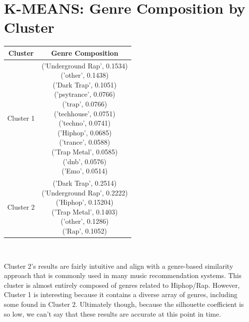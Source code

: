 \documentclass[conference]{IEEEtran}
\begin{document}
\section*{K-MEANS: Genre Composition by Cluster}
\begin{table}[ht!]
    \centering
        \begin{tabular}{| c | c |}
        \hline
        Cluster & Genre Composition \\
        \hline
        Cluster 1 & \makecell{ ('Underground Rap', 0.1534) \\ ('other', 0.1438) \\ ('Dark Trap', 0.1051) \\ ('psytrance', 0.0766) \\ ('trap', 0.0766) \\ ('techhouse', 0.0751) \\ ('techno', 0.0741) \\ ('Hiphop', 0.0685) \\ ('trance', 0.0588) \\ ('Trap Metal', 0.0585) \\ ('dnb', 0.0576) \\ ('Emo', 0.0514) \\ } \\ 
        \hline
        Cluster 2 & \makecell{('Dark Trap', 0.2514) \\ ('Underground Rap', 0.2222) \\ ('Hiphop', 0.15204) \\ ('Trap Metal', 0.1403) \\ ('other', 0.1286) \\ ('Rap', 0.1052) \\ } \\ 
        \hline
        \end{tabular} \\
        \label{tab:kmeans-clust-prof}
\end{table}


Cluster 2's results are fairly intuitive and align with a genre-based similarity approach that is commonly used in many music recommendation systems. This cluster is almost entirely composed of genres related to Hiphop/Rap. However, Cluster 1 is interesting because it contains a diverse array of genres, including some found in Cluster 2. Ultimately though, because the silhouette coefficient is so low, we can't say that these results are accurate at this point in time. 
\end{document}
